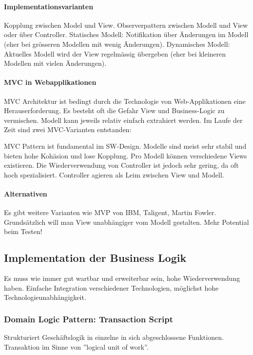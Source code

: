 \paragraph{Implementationsvarianten} Kopplung zwischen Model und View. Observerpattern zwischen Modell und View oder über Controller. Statisches Modell: Notifikation über Änderungen im Modell (eher bei grösseren Modellen mit wenig Änderungen). Dynamisches Modell: Aktuelles Modell wird der View regelmässig übergeben (eher bei kleineren Modellen mit vielen Änderungen).

\paragraph{MVC in Webapplikationen} 
MVC Architektur ist bedingt durch die Technologie von Web-Applikationen eine Herauserforderung. Es besteht oft die Gefahr View und Business-Logic zu vermischen. Modell kann jeweils relativ einfach extrahiert werden. Im Laufe der Zeit sind zwei MVC-Varianten entstanden:

MVC Pattern ist fundamental im SW-Design. Modelle sind meist sehr stabil und bieten hohe Kohäsion und lose Kopplung. Pro Modell können verschiedene Views existieren. Die Wiederverwendung von Controller ist jedoch sehr gering, da oft hoch spezialisiert. Controller agieren als Leim zwischen View und Modell.

\paragraph{Alternativen} Es gibt weitere Varianten wie MVP von IBM, Taligent, Martin Fowler. Grundsätzlich will man View unabhängiger vom Modell gestalten. Mehr Potential beim Testen!

\subsection{Implementation der Business Logik}
Es muss wie immer gut wartbar und erweiterbar sein, hohe Wiederverwendung haben. Einfache Integration verschiedener Technologien, möglichst hohe Technologieunabhängigkeit.

\subsubsection{Domain Logic Pattern: Transaction Script}
Strukturiert Geschäftslogik in einzelne in sich abgeschlossene Funktionen. Transaktion im Sinne von ''logical unit of work''.

